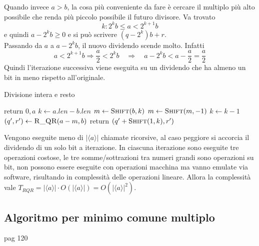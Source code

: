 Quando invece $a > b$, la cosa più conveniente da fare è cercare il multiplo più alto possibile che renda più piccolo possibile il futuro divisore.
Va trovato
\begin{equation*}
    k:
    2^k b
    \leq
    a < 2^{k+1} b
\end{equation*}
e quindi 
$
a - 2^k b \geq 0 
$
e si può scrivere
$
\left( q - 2^k \right) b + r
$.
\\
Passando da $a$ a $
a - 2^k b
$, il nuovo dividendo scende molto.
Infatti
\begin{equation*}
    a < 2^{k+1} b
    \Rightarrow
    \frac{a}{2}
    < 2^{k} b
    \quad
    \Rightarrow
    \quad
    a - 2^k b < a -
    \frac{a}{2}
    = 
    \frac{a}{2}
\end{equation*}
Quindi l'iterazione successiva viene eseguita su un dividendo che ha almeno un bit in meno rispetto all'originale.
\begin{algorithm}[H]
\caption{Divisione intera e resto}\label{alg:divisione_resto}
\begin{algorithmic}[1]
            \State return $0, a$
        \EndIf
        \State $k \gets a.len - b.len$
        \State $m \gets \Call{Shift}{b, k}$
            \State $m \gets \Call{Shift}{m, -1}$
            \State $k \gets k-1$
        \EndIf
        \State $\left( q', r' \right) \gets \Call{R\_QR}{a-m, b}$
        \State return $
        \left( 
            q' + \Call{Shift}{1, k}, r'
        \right)
        $
    \EndProcedure
\end{algorithmic}
\end{algorithm}
\noindent
Vengono eseguite meno di $
| \langle a \rangle |
$ chiamate ricorsive, al caso peggiore si accorcia il dividendo di un solo bit a iterazione.
In ciascuna iterazione sono eseguite tre operazioni costose, le tre somme/sottrazioni tra numeri grandi sono operazioni su bit, non possono essere eseguite con operazioni macchina ma vanno emulate via software, risultando in complessità delle operazioni lineare.
Allora la complessità vale $
T_{RQR} = 
| \langle a \rangle |
\cdot
O \left( 
    | \langle a \rangle |
\right)
=
O \left( 
    | \langle a \rangle |^2
\right)
$.

\subsection{Algoritmo per minimo comune multiplo}
pag 120

